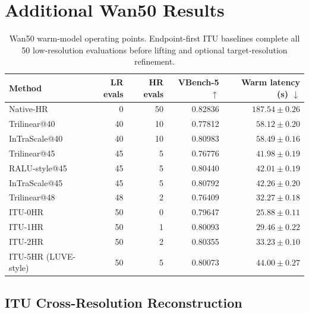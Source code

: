 \documentclass[letterpaper]{article}
\begin{document}
\clearpage
\onecolumn

\section{Additional Wan50 Results}

\begin{table}[H]
  \centering
  \small
  \setlength{\tabcolsep}{5pt}
  \begin{tabular}{lrrrr}
    \toprule
    Method & LR evals & HR evals & VBench-5 \(\uparrow\) &
    Warm latency (s) \(\downarrow\) \\
    \midrule
    Native-HR & 0 & 50 & 0.82836 & \(187.54\pm0.26\) \\
    Trilinear@40 & 40 & 10 & 0.77812 & \(58.12\pm0.20\) \\
    InTraScale@40 & 40 & 10 & 0.80983 & \(58.49\pm0.16\) \\
    Trilinear@45 & 45 & 5 & 0.76776 & \(41.98\pm0.19\) \\
    RALU-style@45 & 45 & 5 & 0.80440 & \(42.01\pm0.19\) \\
    InTraScale@45 & 45 & 5 & 0.80792 & \(42.26\pm0.20\) \\
    Trilinear@48 & 48 & 2 & 0.76409 & \(32.27\pm0.18\) \\
    ITU-0HR & 50 & 0 & 0.79647 & \(25.88\pm0.11\) \\
    ITU-1HR & 50 & 1 & 0.80093 & \(29.46\pm0.22\) \\
    ITU-2HR & 50 & 2 & 0.80355 & \(33.23\pm0.10\) \\
    ITU-5HR (LUVE-style) & 50 & 5 & 0.80073 & \(44.00\pm0.27\) \\
    \bottomrule
  \end{tabular}
  \caption{Wan50 warm-model operating points.  Endpoint-first ITU baselines
  complete all 50 low-resolution evaluations before lifting and optional
  target-resolution refinement.}
  \label{tab:wan50-full}
\end{table}

\subsection{ITU Cross-Resolution Reconstruction}
\end{document}
